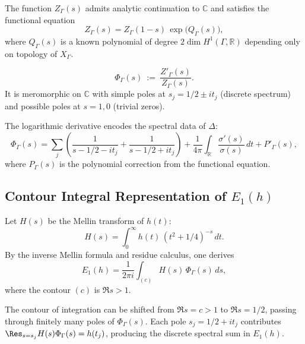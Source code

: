 \begin{theorem}\label{thm:zeta-analytic}\relax
The function $Z_\Gamma(s)$ admits analytic continuation to $\mathbb{C}$ and satisfies the functional equation
\[
Z_\Gamma(s)=Z_\Gamma(1-s)\,\exp\!\big(Q_\Gamma(s)\big),
\]
where $Q_\Gamma(s)$ is a known polynomial of degree $2\dim H^1(\Gamma,\mathbb{R})$ depending only on topology of $X_\Gamma$. %
\end{theorem}

\begin{definition}\label{def:log-derivative}\relax
\[
\Phi_\Gamma(s)\ :=\ \frac{Z'_\Gamma(s)}{Z_\Gamma(s)}.
\]
It is meromorphic on $\mathbb{C}$ with simple poles at $s_j=1/2\pm i t_j$ (discrete spectrum) and possible poles at $s=1,0$ (trivial zeros). %
\end{definition}

\begin{remark}\label{rem:spectral-log}\relax
The logarithmic derivative encodes the spectral data of $\Delta$:
\[
\Phi_\Gamma(s)=\sum_j\left(\frac{1}{s-1/2-it_j}+\frac{1}{s-1/2+it_j}\right)+\frac{1}{4\pi}\int_{\mathbb{R}}\frac{\sigma'(s)}{\sigma(s)}\,dt + P'_\Gamma(s),
\]
where $P_\Gamma(s)$ is the polynomial correction from the functional equation. %
\end{remark}

\subsection{Contour Integral Representation of $E_1(h)$}\relax\hspace{0pt}
\label{subsec:contour-E1}\relax\hspace{0pt}

Let $H(s)$ be the Mellin transform of $h(t)$:
\[
H(s)=\int_{0}^\infty h(t)\,(t^2+1/4)^{-s}\,dt.
\]
By the inverse Mellin formula and residue calculus, one derives
\[
E_1(h)=\frac{1}{2\pi i}\int_{(c)}H(s)\,\Phi_\Gamma(s)\,ds,
\]
where the contour $(c)$ is $\Re s>1$. %

\begin{lemma}\label{lem:contour-shift}\relax
The contour of integration can be shifted from $\Re s=c>1$ to $\Re s=1/2$, passing through finitely many poles of $\Phi_\Gamma(s)$.  
Each pole $s_j=1/2+it_j$ contributes $\Res_{s=s_j}H(s)\Phi_\Gamma(s)=h(t_j)$, producing the discrete spectral sum in $E_1(h)$. %
\end{lemma}

